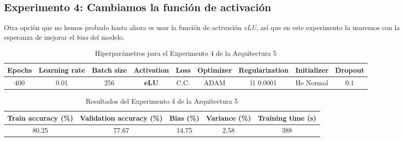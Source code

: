 \documentclass{article}
\begin{document}
		
		\subsection{Experimento 4: Cambiamos la funci\'on de activaci\'on}
		\label{d-s-a5-e4}
			Otra opci\'on que no hemos probado hasta ahora es usar la funci\'on de activaci\'on \textit{eLU}, as\'i que en este experimento la usaremos con la esperanza de mejorar el \textit{bias} del modelo.
		
			\begin{table}[!h]
				\begin{center}
					\begin{tabular}{| c | c | c | c | c | c | c | c | c |}
						\textbf{Epochs} & \textbf{Learning rate} & \textbf{Batch size} & \textbf{Activation} & \textbf{Loss} & \textbf{Optimizer} & \textbf{Regularization} & \textbf{Initializer} & \textbf{Dropout}\\ \hline
						 400 & 0.01 & 256 & \textbf{eLU} & C.C. & ADAM & l1 0.0001 & He Normal & 0.1
					\end{tabular}
					\caption{Hiperpar\'ametros para el Experimento 4 de la Arquitectura 5}
					\label{tab:hip-d-a5-e4}
				\end{center}
			\end{table}
			\begin{table}[!h]
				\begin{center}
					\begin{tabular}{| c | c | c | c | c |}
						\textbf{Train accuracy (\%)} & \textbf{Validation accuracy (\%)} & \textbf{Bias (\%)} & \textbf{Variance (\%)} & \textbf{Training time (s)} \\ \hline
						80.25 & 77.67 & 14.75 & 2.58 & 388\\ \hline
					\end{tabular}
					\caption{Resultados del Experimento 4 de la Arquitectura 5}
					\label{tab:res-d-a5-e4}
				\end{center}
			\end{table}
		    
\end{document}
